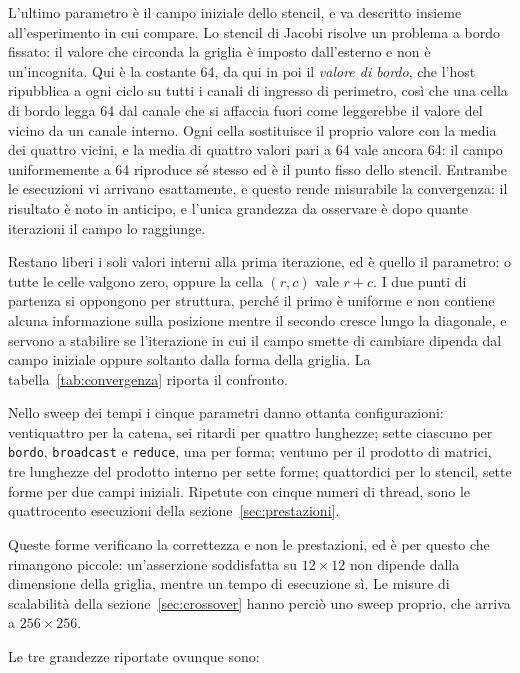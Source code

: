 L'ultimo parametro è il campo iniziale dello stencil, e va descritto insieme
all'esperimento in cui compare. Lo stencil di Jacobi risolve un problema a
bordo fissato: il valore che circonda la griglia è imposto dall'esterno e non
è un'incognita. Qui è la costante 64, da qui in poi il \emph{valore di bordo},
che l'host ripubblica a ogni ciclo su
tutti i canali di ingresso di perimetro, così che una cella di bordo legga 64
dal canale che si affaccia fuori come leggerebbe il valore del vicino da un
canale interno. Ogni cella sostituisce il proprio valore con la media dei
quattro vicini, e la media di quattro valori pari a 64 vale ancora 64: il
campo uniformemente a 64 riproduce sé stesso ed è il punto fisso dello
stencil. Entrambe le esecuzioni vi arrivano esattamente, e questo rende
misurabile la convergenza: il risultato è noto in anticipo, e l'unica
grandezza da osservare è dopo quante iterazioni il campo lo raggiunge.

Restano liberi i soli valori interni alla prima iterazione, ed è quello il
parametro: o tutte le celle valgono zero, oppure la cella $(r,c)$ vale $r+c$.
I due punti di partenza si oppongono per struttura, perché il primo è
uniforme e non contiene alcuna informazione sulla posizione mentre il secondo
cresce lungo la diagonale, e servono a stabilire se l'iterazione in cui il
campo smette di cambiare dipenda dal campo iniziale oppure soltanto dalla
forma della griglia. La tabella~\ref{tab:convergenza} riporta il confronto.

Nello sweep dei tempi i cinque parametri danno ottanta configurazioni: ventiquattro per la
catena, sei ritardi per quattro lunghezze; sette ciascuno per \texttt{bordo},
\texttt{broadcast} e \texttt{reduce}, una per forma; ventuno per il prodotto di
matrici, tre lunghezze del prodotto interno per sette forme; quattordici per lo
stencil, sette forme per due campi iniziali. Ripetute con cinque numeri di
thread, sono le quattrocento esecuzioni della sezione~\ref{sec:prestazioni}.

Queste forme verificano la correttezza e non le prestazioni, ed è per questo
che rimangono piccole: un'asserzione soddisfatta su $12\times12$ non dipende
dalla dimensione della griglia, mentre un tempo di esecuzione sì. Le misure di scalabilità
della sezione~\ref{sec:crossover} hanno perciò uno sweep proprio, che arriva a
$256\times256$.

Le tre grandezze riportate ovunque sono:

